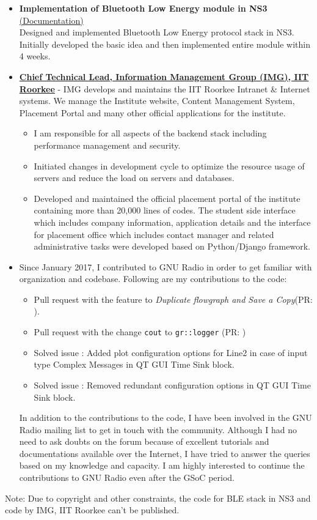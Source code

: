 \documentclass[a4paper, 11pt]{article}
\begin{document}
\begin{itemize}
\item \textbf{Implementation of Bluetooth Low Energy module in NS3} \href{http://kartikpatel.in/ns-3-dev-git/}{(Documentation)}\\ Designed and implemented Bluetooth Low Energy protocol stack in NS3. Initially developed the basic idea and then implemented entire module within 4 weeks.

\item \href{http://img.channeli.in}{\textbf{Chief Technical Lead, Information Management Group (IMG), IIT Roorkee}} - IMG develops and maintains the IIT Roorkee Intranet \& Internet systems. We manage the Institute website, Content Management System, Placement Portal and many other official applications for the institute.
\begin{itemize}
\item I am responsible for all aspects of the backend stack including performance management and security.
\item Initiated changes in development cycle to optimize the resource usage of servers and reduce the load on servers and databases.
\item Developed and maintained the official placement portal of the institute containing more than 20,000 lines of codes. The student side interface which includes company information, application details and the interface for placement office which includes contact manager and related administrative tasks were developed based on Python/Django framework.
\end{itemize}

\item Since January 2017, I contributed to GNU Radio in order to get familiar with organization and codebase. Following are my contributions to the code:
\begin{itemize}
\item Pull request with the feature to \textit{Duplicate flowgraph and Save a Copy}(PR: ).
\item Pull request with the change \texttt{cout} to \texttt{gr::logger} (PR: )
\item Solved issue : Added plot configuration options for Line2 in case of input type Complex Messages in QT GUI Time Sink block.
\item Solved issue : Removed redundant configuration options in QT GUI Time Sink block.
\end{itemize}

In addition to the contributions to the code, I have been involved in the GNU Radio mailing list to get in touch with the community. Although I had no need to ask doubts on the forum because of excellent tutorials and documentations available over the Internet, I have tried to answer the queries based on my knowledge and capacity. I am highly interested to continue the contributions to GNU Radio even after the GSoC period.

\end{itemize}
Note: Due to copyright and other constraints, the code for BLE stack in NS3 and code by IMG, IIT Roorkee can't be published.
\end{document}
